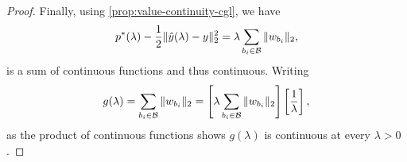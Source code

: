 \begin{proof}
	Finally, using \cref{prop:value-continuity-cgl}, we have
	\[
		p^*(\lambda) - \frac 1 2 \|\hat y(\lambda) - y\|_2^2 = \lambda \sum_{{b_i} \in \mathcal{B}} \|w_{b_i}\|_2,
	\]
	is a sum of continuous functions and thus continuous.
	Writing
	\[
		g(\lambda) = \sum_{{b_i} \in \mathcal{B}} \|w_{b_i}\|_2 = \left[\lambda \sum_{{b_i} \in \mathcal{B}} \|w_{b_i}\|_2\right] \left[\frac{1}{\lambda}\right],
	\]
	as the product of continuous functions shows
	\( g(\lambda) \) is continuous at every \( \lambda > 0 \).
\end{proof}


